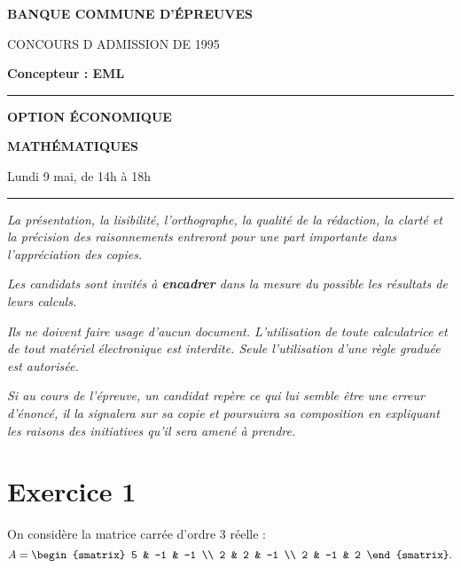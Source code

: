 \documentclass[11pt]{article}%
\begin{document}

\begin{center}
{\LARG\E\textbf{BANQUE COMMUNE D'ÉPREUVES}}



{\large \textsc{CONCOURS D ADMISSION DE 1995}}



{\large \textbf{Concepteur : EML}}



\rule{2.39cm}{0.05cm}



{\Large \textbf{OPTION ÉCONOMIQUE}}



{\Large \textbf{MATHÉMATIQUES }}



{\Large Lundi 9 mai, de 14h à 18h}



\rule{2.39cm}{0.05cm}
\end{center}

\textit{La présentation, la lisibilité, l'orthographe, la qualité
de la rédaction, la clarté et la précision des raisonnements
entreront pour une part importante dans l'appréciation des copies.}

\textit{Les candidats sont invités à \textbf{encadrer} dans la mesure
du possible les résultats de leurs calculs.}

\textit{Ils ne doivent faire usage d'aucun document. L'utilisation de
toute
calculatrice et de tout matériel électronique est interdite. Seule
l'utilisation d'une règle graduée est autorisée.}

\textit{Si au cours de l'épreuve, un candidat repère ce qui lui semble
être une erreur d'énoncé, il la signalera sur sa copie et
poursuivra sa composition en expliquant les raisons des initiatives
qu'il sera
amené à prendre.}

\vspace*{3cm}

\section*{Exercice 1}

On considère la matrice carrée d'ordre 3 réelle : 
\[
A = 
\begin{smatrix}
5 & -1 & -1 \\
2 & 2 & -1 \\
2 & -1 & 2
\end{smatrix}.
\]
\end{document}
